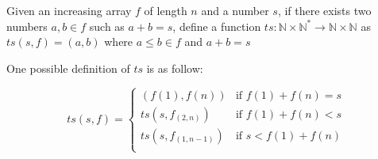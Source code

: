 \documentclass{article}
\begin{document}
Given an increasing array $f$ of length $n$ and a number $s$, if there exists two numbers $a, b \in f$ such as $a + b = s$, define a function $ts: \mathbb{N} \times \mathbb{N}^* \to \mathbb{N} \times \mathbb{N}$ as $ts(s, f) = (a, b)$ where $a \leq b \in f$ and $a + b = s$

One possible definition of $ts$ is as follow:

\begin{equation}
    ts(s, f) = 
    \begin{cases}
    (f(1), f(n)) &\text{if $f(1) + f(n) = s$} \\
    ts(s, f_{(2, n)}) &\text{if $f(1) + f(n) < s$} \\
    ts(s, f_{(1, n-1)}) &\text{if $s < f(1) + f(n)$} \\
    \end{cases}
\end{equation}
\end{document}
